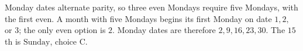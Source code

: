Monday dates alternate parity, so three even Mondays require five Mondays, with the first even. A month with five Mondays begins its first Monday on date $1,2,$ or $3$; the only even option is $2$. Monday dates are therefore $2,9,16,23,30$. The $15$th is $\boxed{\text{Sunday}}$, choice C.
